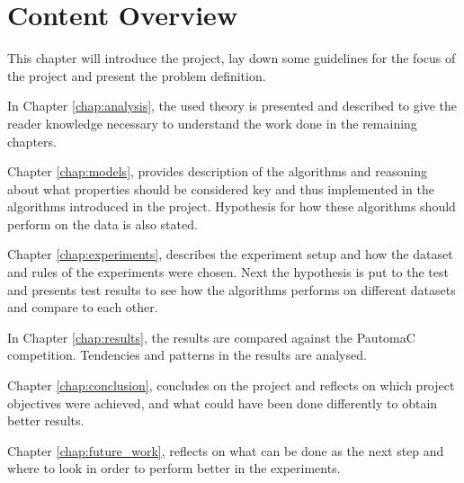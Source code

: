 \section{Content Overview}
This chapter will introduce the project, lay down some guidelines for the focus of the project and present the problem definition.

In Chapter \ref{chap:analysis}, the used theory is presented and described to give the reader knowledge necessary to understand the work done in the remaining chapters.

Chapter \ref{chap:models}, provides description of the algorithms and reasoning about what properties should be considered key and thus implemented in the algorithms introduced in the project. Hypothesis for how these algorithms should perform on the data is also stated.

Chapter \ref{chap:experiments}, describes the experiment setup and how the dataset and rules of the experiments were chosen. Next the hypothesis is put to the test and presents test results to see how the algorithms performs on different datasets and compare to each other.

In Chapter \ref{chap:results}, the results are compared against the PautomaC competition. Tendencies and patterns in the results are analysed.

Chapter \ref{chap:conclusion}, concludes on the project and reflects on which project objectives were achieved, and what could have been done differently to obtain better results.

Chapter \ref{chap:future_work}, reflects on what can be done as the next step and where to look in order to perform better in the experiments.